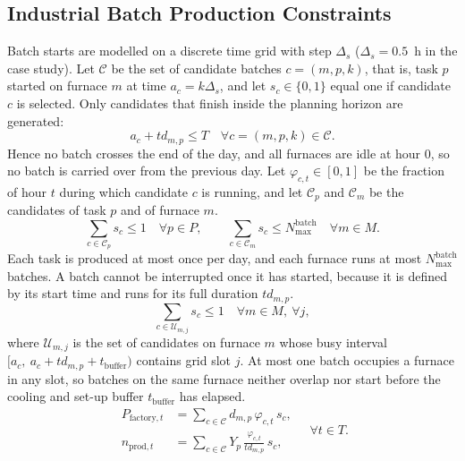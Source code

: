 \documentclass[5p,times,twocolumn]{elsarticle}
\begin{document}
\subsection{Industrial Batch Production Constraints}
Batch starts are modelled on a discrete time grid with step $\Delta_s$
($\Delta_s=0.5$~h in the case study). Let $\mathcal{C}$ be the set of candidate
batches $c=(m,p,k)$, that is, task $p$ started on furnace $m$ at time
$a_c=k\Delta_s$, and let $s_c\in\{0,1\}$ equal one if candidate $c$ is selected.
Only candidates that finish inside the planning horizon are generated:
\begin{equation}
a_c + td_{m,p} \le T \quad \forall c=(m,p,k)\in\mathcal{C}.
\label{eq:horizon}
\end{equation}
Hence no batch crosses the end of the day, and all furnaces are idle at hour 0, so
no batch is carried over from the previous day. Let $\varphi_{c,t}\in[0,1]$ be the
fraction of hour $t$ during which candidate $c$ is running, and let $\mathcal{C}_p$
and $\mathcal{C}_m$ be the candidates of task $p$ and of furnace $m$.
\begin{equation}
\sum_{c\in\mathcal{C}_p} s_c \le 1 \quad \forall p\in P,
\qquad
\sum_{c\in\mathcal{C}_m} s_c \le N^{\text{batch}}_{\max} \quad \forall m\in M.
\label{eq:task_once}
\end{equation}
Each task is produced at most once per day, and each furnace runs at most
$N^{\text{batch}}_{\max}$ batches. A batch cannot be interrupted once it has started, because
it is defined by its start time and runs for its full duration $td_{m,p}$.
\begin{equation}
\sum_{c\in\mathcal{U}_{m,j}} s_c \le 1 \quad \forall m\in M,\ \forall j,
\label{eq:no_overlap}
\end{equation}
where $\mathcal{U}_{m,j}$ is the set of candidates on furnace $m$ whose busy interval
$[a_c,\ a_c+td_{m,p}+t_{\text{buffer}})$ contains grid slot $j$. At most one batch
occupies a furnace in any slot, so batches on the same furnace neither overlap nor
start before the cooling and set-up buffer $t_{\text{buffer}}$ has elapsed.
\begin{equation}
\begin{aligned}
P_{\text{factory},t} &= \sum_{c\in\mathcal{C}} d_{m,p}\,\varphi_{c,t}\,s_c,\\
n_{\text{prod},t} &= \sum_{c\in\mathcal{C}} Y_p\,\frac{\varphi_{c,t}}{td_{m,p}}\,s_c,
\end{aligned}
\quad \forall t\in T.
\label{eq:factory_load}
\end{equation}
\end{document}
